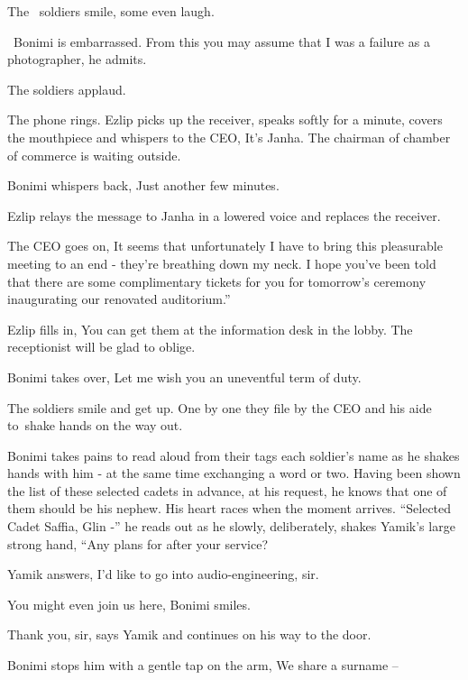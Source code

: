 \documentclass[letterpaper]{article}
\begin{document}
The \ soldiers smile, some even laugh{.}

~Bonimi is embarrassed. {\textquotedbl}From this you may assume that I was a failure as a photographer,{\textquotedbl}
he admits. 

The soldiers applaud.~ 

The phone rings. Ezlip picks up the receiver, speaks softly for a minute, covers the mouthpiece and whispers to the CEO,
{\textquotedbl}It's Janha. The chairman of chamber of commerce is waiting outside.{\textquotedbl} 

Bonimi whispers back, {\textquotedbl}Just another few minutes.{\textquotedbl} 

Ezlip relays the message to Janha in a lowered voice and replaces the receiver.

The CEO goes on, {\textquotedbl}It seems that unfortunately I have to bring this pleasurable meeting to an end - they're
breathing down my neck. I hope you've been told that there are some complimentary tickets for you for
tomorrow's{ }ceremony inaugurating our renovated auditorium.'' 

Ezlip fills in, {\textquotedbl}You can get them at the information desk in the lobby. The receptionist will be glad to
oblige.{\textquotedbl} 

Bonimi takes over, {\textquotedbl}Let me wish you an uneventful term of duty.{\textquotedbl}

The soldiers smile and get up. One by one they file by the CEO and his aide to~shake hands on the way out. 

Bonimi takes pains{ }to read aloud{
}from their tags each soldier's name as he shakes hands with him - at the same time exchanging a word or two. Having
been{ }shown the list of these selected cadets in advance, at his request, he
knows that one of them should be his nephew. His heart races when the moment arrives. ``Selected Cadet Saffia, Glin -''
he reads out as he slowly, deliberately, shakes Yamik's large strong{ }hand,
``Any plans for after your service?{\textquotedbl} 

Yamik answers, {\textquotedbl}I'd like to go into audio-engineering, sir.{\textquotedbl} 

{\textquotedbl}You might even join us here,{\textquotedbl} Bonimi smiles. 

{\textquotedbl}Thank you, sir,{\textquotedbl} says Yamik and continues on his way to the door. 

Bonimi{ }stops{ }him with a gentle tap on the arm, {\textquotedbl}We share a surname
--{\textquotedbl} 
\end{document}
